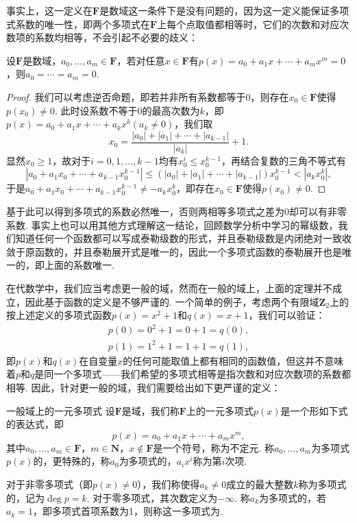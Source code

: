 事实上，这一定义在$\mathbf{F}$是数域这一条件下是没有问题的，因为这一定义能保证多项式系数的唯一性，即两个多项式在$\mathbf{F}$上每个点取值都相等时，它们的次数和对应次数项的系数均相等，不会引起不必要的歧义：
\begin{theorem}{}{}
    设$\mathbf{F}$是数域，$a_0,\ldots,a_m\in\mathbf{F}$，若对任意$x\in\mathbf{F}$有$p(x)=a_0+a_1x+\cdots+a_mx^m=0$，则$a_0=\cdots=a_m=0$.
\end{theorem}
\begin{proof}
    我们可以考虑逆否命题，即若并非所有系数都等于$0$，则存在$x_0\in\mathbf{F}$使得$p(x_0)\neq 0$. 此时设系数不等于$0$的最高次数为$k$，即$p(x)=a_0+a_1x+\cdots+a_kx^k(a_k\neq 0)$，我们取
    \[x_0=\dfrac{|a_0|+|a_1|+\cdots+|a_{k-1}|}{|a_k|}+1.\]
    显然$x_0\geqslant 1$，故对于$i=0,1,\ldots,k-1$均有$x_0^i\leqslant x_0^{k-1}$，再结合复数的三角不等式有
    \[|a_0+a_1x_0+\cdots+a_{k-1}x_0^{k-1}|\leqslant(|a_0|+|a_1|+\cdots+|a_{k-1}|)x_0^{k-1}<|a_kx_0^k|,\]
    于是$a_0+a_1x_0+\cdots+a_{k-1}x_0^{k-1}\neq -a_kx_0^k$，即存在$x_0\in\mathbf{F}$使得$p(x_0)\neq 0$.
\end{proof}
基于此可以得到多项式的系数必然唯一，否则两相等多项式之差为$0$却可以有非零系数. 事实上也可以用其他方式理解这一结论，回顾数学分析中学习的幂级数，我们知道任何一个函数都可以写成泰勒级数的形式，并且泰勒级数是内闭绝对一致收敛于原函数的，并且泰勒展开式是唯一的，因此一个多项式函数的泰勒展开也是唯一的，即上面的系数唯一.

在代数学中，我们应当考虑更一般的域，然而在一般的域上，上面的定理并不成立，因此基于函数的定义是不够严谨的. 一个简单的例子，考虑两个有限域$\mathbf{Z}_2$上的按上述定义的多项式函数$p(x)=x^2+1$和$q(x)=x+1$，我们可以验证：
\begin{gather*}
    p(0)=0^2+1=0+1=q(0),\\
    p(1)=1^2+1=1+1=q(1),
\end{gather*}
即$p(x)$和$q(x)$在自变量$x$的任何可能取值上都有相同的函数值，但这并不意味着$p$和$q$是同一个多项式——我们希望的多项式相等是指次数和对应次数项的系数都相等. 因此，针对更一般的域，我们需要给出如下更严谨的定义：
\begin{definition}{一般域上的一元多项式}{}
    设$\mathbf{F}$是域，我们称$\mathbf{F}$上的一元多项式$p(x)$是一个形如下式的表达式，即
    \begin{equation} \label{eq:17:多项式定义}
        p(x)=a_0+a_1x+\cdots+a_mx^m,
    \end{equation}
    其中$a_0,\ldots,a_m\in\mathbf{F}$，$m\in\mathbf{N}$，$x\notin \mathbf{F}$是一个符号，称为不定元. 称$a_0,\ldots,a_m$为多项式$p(x)$的，更特殊的，称$a_0$为多项式的，$a_ix^i$称为第$i$次项.

    对于非零多项式（即$p(x)\neq 0$），我们称使得$a_k\neq 0$成立的最大整数$k$称为多项式的，记为$\deg p=k$. 对于零多项式，其次数定义为$-\infty$. 称$a_k$为多项式的，若$a_k=1$，即多项式首项系数为1，则称这一多项式为.
\end{definition}

